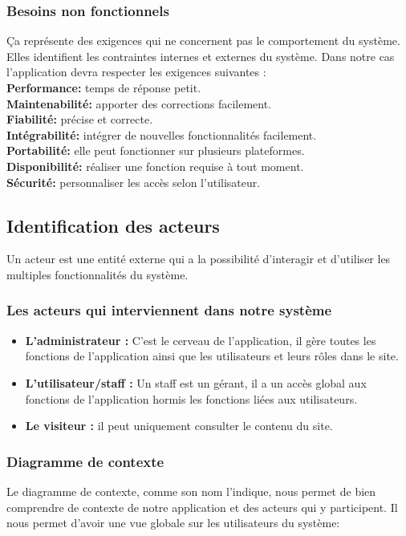 \subsubsection{Besoins non fonctionnels}
Ça représente des exigences qui ne concernent pas le comportement du système. Elles identifient les contraintes internes et externes du système. Dans notre cas l’application devra respecter les exigences suivantes :\\

\noindent \textbf{Performance:} temps de réponse petit.\\
\textbf{Maintenabilité:} apporter des corrections facilement.\\
\textbf{Fiabilité:} précise et correcte.\\
\textbf{Intégrabilité:} intégrer de nouvelles fonctionnalités facilement.\\
\textbf{Portabilité:} elle peut fonctionner sur plusieurs plateformes.\\
\textbf{Disponibilité:} réaliser une fonction requise à tout moment.\\
\textbf{Sécurité:} personnaliser les accès selon l’utilisateur.\\

\subsection{Identification des acteurs}
Un acteur est une entité externe qui a la possibilité d'interagir et d'utiliser les multiples fonctionnalités du système.

\subsubsection{Les acteurs qui interviennent dans notre système}
\begin{itemize}
    \item \textbf{L’administrateur :} C’est le cerveau de l’application, il gère toutes les fonctions de l’application ainsi que les utilisateurs et leurs rôles dans le site.
    \item \textbf{L'utilisateur/staff :} Un staff est un gérant, il a un accès global aux fonctions de l'application hormis les fonctions liées aux utilisateurs.
    \item \textbf{Le visiteur :} il peut uniquement consulter le contenu du site.
\end{itemize}

\subsubsection{Diagramme de contexte}
Le diagramme de contexte, comme son nom l'indique, nous permet de bien comprendre de contexte de notre application et des acteurs qui y participent. Il nous permet d'avoir une vue globale sur les utilisateurs du système:


